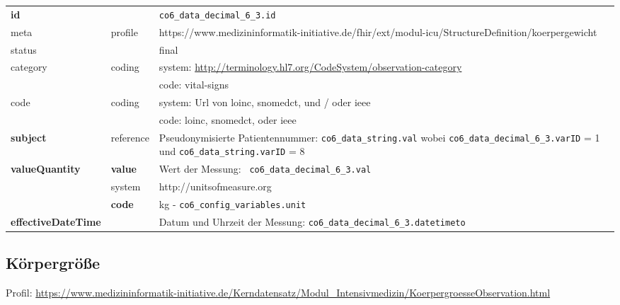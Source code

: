 \begin{longtable}{|l|l|p{7.5cm}|}
        \hline
        \rowcolor{lightgray} \multicolumn{3}{|l|}{Data Mapping (inhaltlich)} \\ \hline
        \textbf{id} &  & \texttt{co6\_data\_decimal\_6\_3.id} \\ \hline
	meta & profile & https://www.medizininformatik-initiative.de/fhir/ext/modul-icu/StructureDefinition/koerpergewicht \\ \hline 
	status &  & final   \\ \hline 
	category & coding & system: \url{http://terminology.hl7.org/CodeSystem/observation-category} \\
\cline{3-3}
	& & code: vital-signs \\ \hline
	code & coding & system: Url von \ac{loinc}, \ac{snomedct}, und / oder \ac{ieee} \\ 
	\cline{3-3} 
	 &  & code: \ac{loinc}, \ac{snomedct}, oder \ac{ieee} \\ \hline
	\textbf{subject} & reference & Pseudonymisierte Patientennummer: \texttt{co6\_data\_string.val} wobei \texttt{co6\_data\_decimal\_6\_3.varID} = 1 und \texttt{co6\_data\_string.varID} = 8 \\ \hline
	 \textbf{valueQuantity}  & \textbf{value} & Wert der Messung: \texttt{
co6\_data\_decimal\_6\_3.val} \\
        \cline{2-3}
         & system & http://unitsofmeasure.org \\
         \cline{2-3}
         & \textbf{code} & kg - \texttt{co6\_config\_variables.unit} \\ \hline
     \textbf{effectiveDateTime}  & & Datum und Uhrzeit der Messung: \texttt{co6\_data\_decimal\_6\_3.datetimeto} \\ \hline
\end{longtable}

\subsection{Körpergröße} 
Profil: \url{https://www.medizininformatik-initiative.de/Kerndatensatz/Modul_Intensivmedizin/KoerpergroesseObservation.html}

